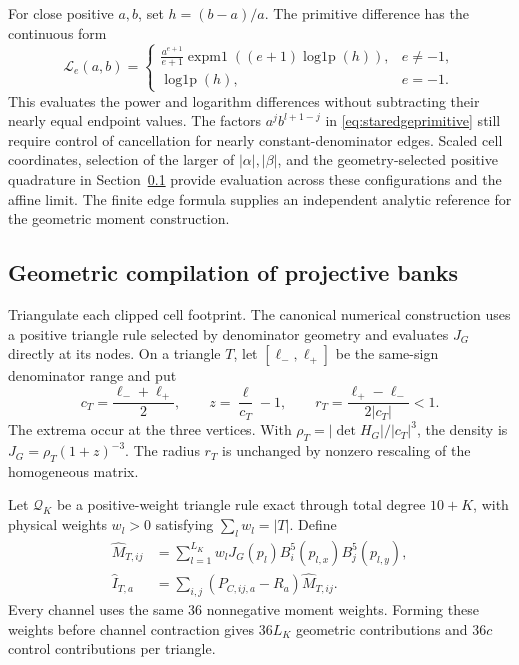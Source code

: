 \documentclass[journal]{IEEEtran}
\begin{document}
For close positive $a,b$, set $h=(b-a)/a$. The primitive difference has the
continuous form
\begin{equation}
 \mathcal L_e(a,b)=
 \begin{cases}
 \displaystyle\frac{a^{e+1}}{e+1}
 \operatorname{expm1}((e+1)\operatorname{log1p}(h)),&e\ne-1,\\
 \operatorname{log1p}(h),&e=-1.
 \end{cases}
\end{equation}
This evaluates the power and logarithm differences without subtracting their
nearly equal endpoint values. The factors $a^j b^{l+1-j}$ in
\eqref{eq:staredgeprimitive} still require control of cancellation for nearly
constant-denominator edges. Scaled cell coordinates, selection of the larger
of $|\alpha|,|\beta|$, and the geometry-selected positive quadrature in
Section~\ref{sec:stargeometric} provide evaluation across these
configurations and the affine limit. The finite edge formula supplies an
independent analytic reference for the geometric moment construction.

\subsection{Geometric compilation of projective banks}
\label{sec:stargeometric}
Triangulate each clipped cell footprint. The canonical numerical construction
uses a positive triangle rule selected by denominator geometry and evaluates
$J_G$ directly at its nodes. On a triangle $T$, let
$[\ell_-,\ell_+]$ be the same-sign denominator range and put
\begin{equation}
 c_T=\frac{\ell_-+\ell_+}{2},\qquad
 z=\frac{\ell}{c_T}-1,\qquad
 r_T=\frac{\ell_+-\ell_-}{2|c_T|}<1.
 \label{eq:stargeometricradius}
\end{equation}
The extrema occur at the three vertices. With
$\rho_T=|\det H_G|/|c_T|^3$, the density is
$J_G=\rho_T(1+z)^{-3}$. The radius $r_T$ is unchanged by nonzero rescaling
of the homogeneous matrix.

Let $\mathcal Q_K$ be a positive-weight triangle rule exact through total
degree $10+K$, with physical weights $w_l>0$ satisfying
$\sum_lw_l=|T|$. Define
\begin{align}
 \widehat M_{T,ij}
 &=\sum_{l=1}^{L_K}w_lJ_G(p_l)
 B_i^5(p_{l,x})B_j^5(p_{l,y}),\nonumber\\
 \widehat I_{T,a}
 &=\sum_{i,j}(P_{C,ij,a}-R_a)\widehat M_{T,ij}.
 \label{eq:starintegratedpolyphase}
\end{align}
Every channel uses the same 36 nonnegative moment weights. Forming these
weights before channel contraction gives $36L_K$ geometric contributions
and $36c$ control contributions per triangle.
\end{document}
